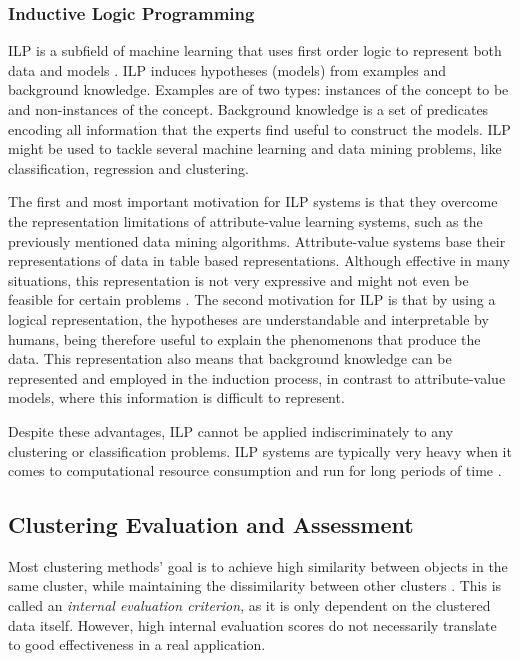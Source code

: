 \subsubsection*{Inductive Logic Programming}

ILP is a subfield of machine learning that uses first order logic to represent
both data and models \cite{Lavrac1998}. ILP induces hypotheses (models) from
examples and background knowledge. Examples are of two types: instances of the
concept to be  and non-instances of the concept. Background
knowledge is a set of predicates encoding all information that the experts find
useful to construct the models. ILP might be used to tackle several machine
learning and data mining problems, like classification, regression and
clustering.

The first and most important motivation for ILP systems is that they overcome
the representation limitations of attribute-value learning systems, such as the
previously mentioned data mining algorithms. Attribute-value systems base their
representations of data in table based representations. Although effective in
many situations, this representation is not very expressive and might not even
be feasible for certain problems \cite{Bratko:1995:AIL:219717.219771}. The
second motivation for ILP is that by using a logical representation, the
hypotheses are understandable and interpretable by humans, being therefore
useful to explain the phenomenons that produce the data. This representation
also means that background knowledge can be represented and employed in the
induction process, in contrast to attribute-value models, where this information
is difficult to represent.

Despite these advantages, ILP cannot be applied indiscriminately to any
clustering or classification problems. ILP systems are typically very heavy when
it comes to computational resource consumption and run for long periods of time
\cite{fonseca2003implementation}.

\subsection{Clustering Evaluation and Assessment}\label{sec:clustereval}

Most clustering methods' goal is to achieve high similarity between objects in
the same cluster, while maintaining the dissimilarity between other clusters
\cite{Manning:2008:IIR:1394399}. This is called an \emph{internal evaluation
criterion}, as it is only dependent on the clustered data itself. However, high
internal evaluation scores do not necessarily translate to good effectiveness in
a real application.

